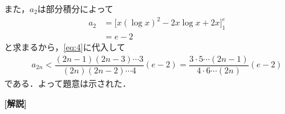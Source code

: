 \documentclass[../../main.tex]{subfiles}
\begin{document}
また，$a_2$は部分積分によって
\begin{align}
  a_2
  &=\bigl[x(\log x)^2-2x\log x+2x\bigr]_1^e \\
  &=e-2
\end{align}
と求まるから，\cref{eq:4}に代入して
\begin{align}
  a_{2n}<\dfrac{(2n-1)(2n-3)\cdots3}{(2n)(2n-2)\cdots4}(e-2)=\dfrac{3\cdot5\cdots(2n-1)}{4\cdot6\cdots(2n)}(e-2)
\end{align}
である．よって題意は示された．

{\bf [解説]}


\newpage
\end{document}
